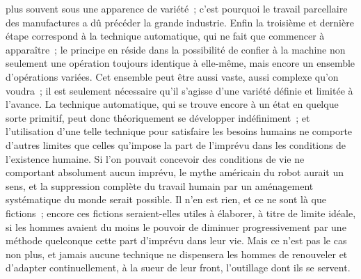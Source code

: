 \documentclass[french,twoside]{book} %
\begin{document}
plus souvent sous une apparence de variété ; c'est pourquoi le travail parcellaire des manufactures a dû précéder la grande industrie. Enfin la troisième et dernière étape correspond à la technique automatique, qui ne fait que commencer à apparaître ; le principe en réside dans la possibilité de confier à la machine non seulement une opération toujours identique à elle-même, mais encore un ensemble d'opérations variées. Cet ensemble peut être aussi vaste, aussi complexe qu'on voudra ; il est seulement nécessaire qu'il s'agisse d'une variété définie et limitée à l'avance. La technique automatique, qui se trouve encore à un état en quelque sorte primitif, peut donc théoriquement se développer indéfiniment ; et l'utilisation d'une telle technique pour satisfaire les besoins humains ne comporte d'autres limites que celles qu'impose la part de l'imprévu dans les conditions de l'existence humaine. Si l'on pouvait concevoir des conditions de vie ne comportant absolument aucun imprévu, le mythe américain du robot aurait un sens, et la suppression complète du travail humain par un aménagement systématique du monde serait possible. Il n'en est rien, et ce ne sont là que fictions ; encore ces fictions seraient-elles utiles à élaborer, à titre de limite idéale, si les hommes avaient du moins le pouvoir de diminuer progressivement par une méthode quelconque cette part d'imprévu dans leur vie. Mais ce n’est pas le cas non plus, et jamais aucune technique ne dispensera les hommes de renouveler et d'adapter continuellement, à la sueur de leur front, l'outillage dont ils se servent.\par
\end{document}
